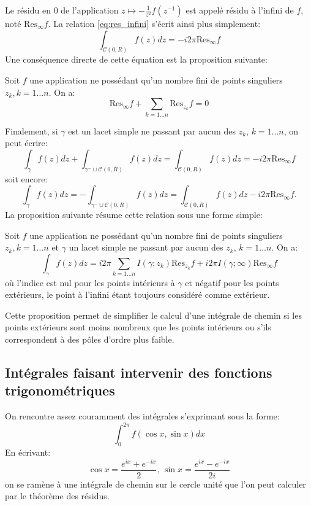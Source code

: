 Le résidu en $0$ de l'application $ z \mapsto -\frac{1}{z^2} f\left(z^{-1}\right)$ est appelé résidu à l'infini de $f$, noté $\text{Res}_{\infty} f .$ La relation \ref{eq:res_infini} s'écrit ainsi plus simplement:
\begin{equation}
\label{eq:res_infini_short}
\int_{\mathcal{C}(0,R)} f(z) dz = -i 2 \pi \text{Res}_\infty f 
\end{equation}
Une conséquence directe de cette équation est la proposition suivante:
\begin{fprop}
Soit $f$ une application ne possédant qu'un nombre fini de points singuliers $z_k,k=1\dots n.$ On a:
\begin{equation}
    \label{eq:somme_residus}
    \text{Res}_\infty f  + \sum_{k=1\dots n}  \text{Res}_{z_k}f = 0
\end{equation}
\end{fprop}
Finalement, si $\gamma$ est un lacet simple ne passant par aucun des $z_k, \, k=1\dots n$, on peut écrire:
\[
\int_\gamma f(z) dz + \int_{\gamma^- \cup \mathcal{C}(0,R)} f(z) dz= \int_{\mathcal{C}(0,R)}f(z)dz = - i 2 \pi \text{Res}_\infty f
\]
soit encore:
\[
\int_\gamma f(z) dz =-  \int_{\gamma^- \cup \mathcal{C}(0,R)} f(z) dz  = \int_{\mathcal{C}(0,R)} f(z)dz - i 2 \pi \text{Res}_\infty f.
\]
La proposition suivante résume cette relation sous une forme simple:
\begin{fprop}
    \label{prop:residus_gen}
    Soit $f$ une application ne possédant qu'un nombre fini de points singuliers $z_k,k=1\dots n$ et $\gamma$ un lacet simple ne passant par aucun des $z_k, \, k=1 \dots n.$ On a:
    \begin{equation}
        \label{eq:residus_gen}
        \int_\gamma f(z) dz = i 2 \pi \sum_{k =1 \dots n} I\left(
        \gamma; z_k
        \right) \text{Res}_{z_k} f + i 2 \pi  I\left(
        \gamma; \infty
        \right)\text{Res}_\infty f
    \end{equation}
    où l'indice est nul pour les points intérieurs à $\gamma$ et négatif pour les points extérieurs, le point à l'infini étant toujours considéré comme extérieur.
\end{fprop}

Cette proposition permet de simplifier le calcul d'une intégrale de chemin si les points extérieurs sont moins nombreux que les points intérieurs ou s'ils correspondent à des pôles d'ordre plus faible. 
\subsection{Intégrales faisant intervenir des fonctions trigonométri\-ques}
On rencontre assez couramment des intégrales s'exprimant sous la forme:
\[
\int_0^{2\pi} f\left(\cos x, \sin x
\right) dx
\]
En écrivant:
\[
\cos{x} = \frac{e^{ix}+e^{-ix}}{2}, \, \sin{x} = \frac{e^{ix}-e^{-ix}}{2i}
\]
on se ramène à une intégrale de chemin sur le cercle unité que l'on peut calculer par le théorème des résidus.
